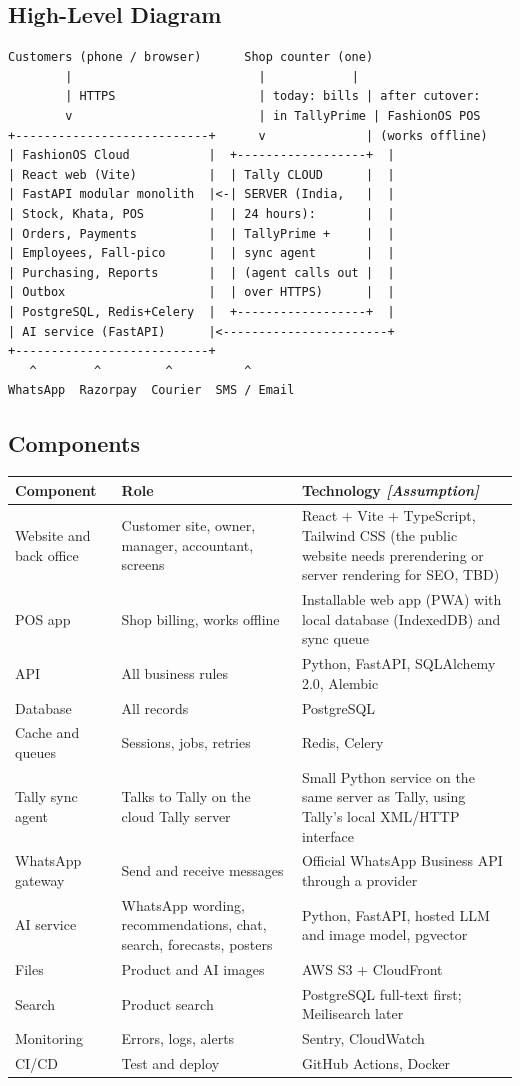 \documentclass[11pt,a4paper]{article}
\newcommand{\assump}{\textit{[Assumption]}}
\newcommand{\hdr}{\rowcolor{hdrgray}\bfseries}
\begin{document}
\subsection{High-Level Diagram}
\begin{lstlisting}
Customers (phone / browser)      Shop counter (one)
        |                          |            |
        | HTTPS                    | today: bills | after cutover:
        v                          | in TallyPrime | FashionOS POS
+---------------------------+      v              | (works offline)
| FashionOS Cloud           |  +------------------+  |
| React web (Vite)          |  | Tally CLOUD      |  |
| FastAPI modular monolith  |<-| SERVER (India,   |  |
| Stock, Khata, POS         |  | 24 hours):       |  |
| Orders, Payments          |  | TallyPrime +     |  |
| Employees, Fall-pico      |  | sync agent       |  |
| Purchasing, Reports       |  | (agent calls out |  |
| Outbox                    |  | over HTTPS)      |  |
| PostgreSQL, Redis+Celery  |  +------------------+  |
| AI service (FastAPI)      |<-----------------------+
+---------------------------+
   ^        ^         ^          ^
WhatsApp  Razorpay  Courier  SMS / Email
\end{lstlisting}

\subsection{Components}
\begin{longtable}{L{3cm}L{5cm}L{8.5cm}}
\hdr Component & Role & Technology \assump \\ \endhead
Website and back office & Customer site, owner, manager, accountant, screens & React + Vite + TypeScript, Tailwind CSS (the public website needs prerendering or server rendering for SEO, TBD) \\
POS app & Shop billing, works offline & Installable web app (PWA) with local database (IndexedDB) and sync queue \\
API & All business rules & Python, FastAPI, SQLAlchemy 2.0, Alembic \\
Database & All records & PostgreSQL \\
Cache and queues & Sessions, jobs, retries & Redis, Celery \\
Tally sync agent & Talks to Tally on the cloud Tally server & Small Python service on the same server as Tally, using Tally's local XML/HTTP interface \\
WhatsApp gateway & Send and receive messages & Official WhatsApp Business API through a provider \\
AI service & WhatsApp wording, recommendations, chat, search, forecasts, posters & Python, FastAPI, hosted LLM and image model, pgvector \\
Files & Product and AI images & AWS S3 + CloudFront \\
Search & Product search & PostgreSQL full-text first; Meilisearch later \\
Monitoring & Errors, logs, alerts & Sentry, CloudWatch \\
CI/CD & Test and deploy & GitHub Actions, Docker \\
\end{longtable}
\end{document}
